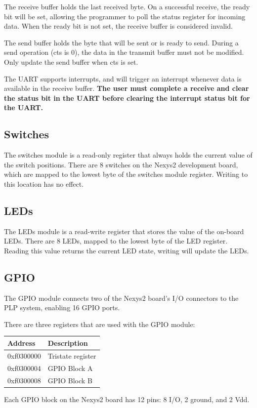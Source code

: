 \documentclass{article}
\begin{document}
The receive buffer holds the last received byte. On a successful receive, the ready bit will be set, allowing the programmer to poll the status register for incoming data. When the ready bit is not set, the receive buffer is considered invalid.

The send buffer holds the byte that will be sent or is ready to send. During a send operation (cts is 0), the data in the transmit buffer must not be modified. Only update the send buffer when cts is set.

The UART supports interrupts, and will trigger an interrupt whenever data is available in the receive buffer. \textbf{The user must complete a receive and clear the status bit in the UART before clearing the interrupt status bit for the UART.}
\subsection{Switches}
The switches module is a read-only register that always holds the current value of the switch positions. There are 8 switches on the Nexys2 development board, which are mapped to the lowest byte of the switches module register. Writing to this location has no effect. 
\subsection{LEDs}
The LEDs module is a read-write register that stores the value of the on-board LEDs. There are 8 LEDs, mapped to the lowest byte of the LED register. Reading this value returns the current LED state, writing will update the LEDs. 
\subsection{GPIO}
The GPIO module connects two of the Nexys2 board's I/O connectors to the PLP system, enabling 16 GPIO ports.

There are three registers that are used with the GPIO module: 

\begin{tabular}{ | l | l |}
\hline
Address & Description \\
\hline
0xf0300000 & Tristate register \\
0xf0300004 & GPIO Block A \\
0xf0300008 & GPIO Block B \\
\hline
\end{tabular}

Each GPIO block on the Nexys2 board has 12 pins: 8 I/O, 2 ground, and 2 Vdd.
\end{document}
